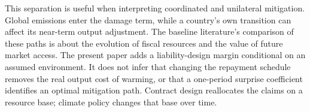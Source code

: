 This separation is useful when interpreting coordinated and unilateral mitigation. Global emissions enter the damage term, while a country's own transition can affect its near-term output adjustment. The baseline literature's comparison of these paths is about the evolution of fiscal resources and the value of future market access. The present paper adds a liability-design margin conditional on an assumed environment. It does not infer that changing the repayment schedule removes the real output cost of warming, or that a one-period surprise coefficient identifies an optimal mitigation path. Contract design reallocates the claims on a resource base; climate policy changes that base over time.
